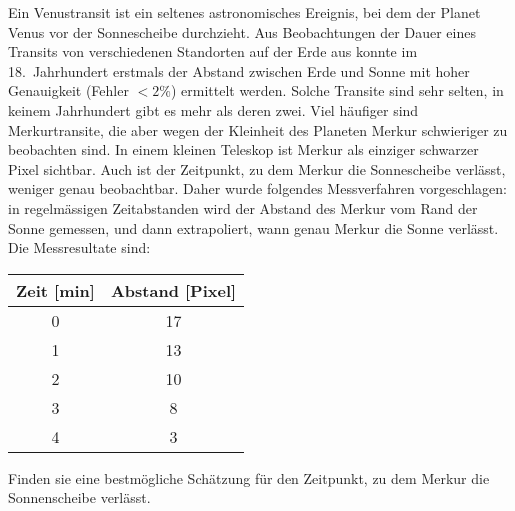 Ein Venustransit ist ein seltenes astronomisches Ereignis, bei dem
der Planet Venus vor der Sonnescheibe durchzieht.
Aus Beobachtungen der Dauer eines Transits von verschiedenen Standorten
auf der Erde aus konnte im 18.~Jahrhundert erstmals der Abstand
zwischen Erde und Sonne mit hoher Genauigkeit (Fehler $< 2\%$) ermittelt
werden. Solche Transite sind sehr selten, in keinem Jahrhundert gibt es
mehr als deren zwei. Viel häufiger sind Merkurtransite, die aber wegen
der Kleinheit des Planeten Merkur schwieriger zu beobachten sind.
In einem kleinen Teleskop ist Merkur als einziger schwarzer Pixel
sichtbar. Auch ist der Zeitpunkt, zu dem Merkur die Sonnescheibe
verlässt, weniger genau beobachtbar. Daher wurde folgendes Messverfahren
vorgeschlagen: in regelmässigen Zeitabstanden wird der Abstand des
Merkur vom Rand der Sonne gemessen, und dann extrapoliert, wann genau
Merkur die Sonne verlässt. Die Messresultate sind:
\begin{center}
\begin{tabular}{cc}
Zeit [min]&Abstand [Pixel]\\
\hline
0&17\\
1&13\\
2&10\\
3&8\\
4&3\\
\hline
\end{tabular}
\end{center}
Finden sie eine bestmögliche Schätzung für den Zeitpunkt, zu dem
Merkur die Sonnenscheibe verlässt.


